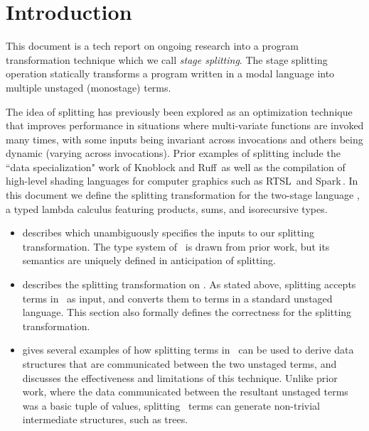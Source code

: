 \documentclass[preprint]{sigplanconf}
\begin{document}
\section{Introduction}

This document is a tech report on ongoing research into a program transformation
technique which we call {\em stage splitting}.  The stage splitting operation statically transforms a program written in a modal language into multiple unstaged (monostage) terms.

The idea of splitting has previously been explored as an optimization technique that improves performance in situations where multi-variate functions are invoked many times, with some inputs being invariant across invocations and others being dynamic (varying across invocations). Prior examples of splitting include the ``data specialization" work of Knoblock and Ruff\,\cite{knoblock96} as well as the compilation of high-level shading languages for computer graphics such as RTSL\,\cite{Proudfoot:2001} and Spark\,\cite{Foley:2011}. In this document we define the splitting transformation for the two-stage language \lang, a typed lambda calculus featuring products, sums, and isorecursive types. 


\begin{itemize}
\item {} describes \lang which unambiguously specifies the inputs to 
our splitting transformation.  The type system of \lang\ is drawn from prior work, but its semantics are uniquely defined in anticipation of splitting.

\item {} describes the splitting transformation on \lang.  As stated above, splitting accepts terms in \lang\ as input, and converts them to terms in a standard unstaged language.  This section also formally defines the correctness for the splitting transformation.

\item {} gives several examples of how splitting terms in \lang\ can be used
to derive data structures that are communicated between the two unstaged terms, and discusses the effectiveness and limitations of this technique.  Unlike prior work, where the data communicated between the resultant unstaged terms was a basic tuple of values, splitting \lang\ terms can generate non-trivial intermediate structures, such as trees.
\end{itemize}










\end{document}
